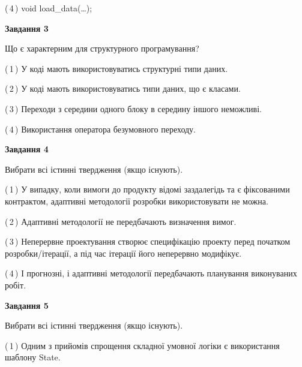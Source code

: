 \documentclass[10pt, ukrainian]{article}
\begin{document}
{\begin {large}
(\,4\,) void load\_data(…);%


{\begin {center}\textbf{Завдання 3}\end {center}}\par
Що є характерним для структурного програмування?\par
\vspace{2mm}



(\,1\,) У коді мають використовуватись структурні типи даних. %



(\,2\,) У коді мають використовуватись типи даних, що є класами. %



(\,3\,) Переходи з середини одного блоку в середину іншого неможливі. %



(\,4\,) Використання оператора безумовного переходу. %


{\begin {center}\textbf{Завдання 4}\end {center}}\par
Вибрати всі істинні твердження (якщо існують).\par
\vspace{2mm}



(\,1\,) У випадку, коли вимоги до продукту відомі заздалегідь та є фіксованими контрактом, адаптивні методології розробки використовувати не можна. %



(\,2\,) Адаптивні методології не передбачають визначення вимог. %



(\,3\,) Неперервне проектування створює специфікацію проекту перед початком розробки/ітерації, а під час ітерації його неперервно модифікує.%



(\,4\,) І прогнозні, і адаптивні методології передбачають планування виконуваних робіт. %


{\begin {center}\textbf{Завдання 5}\end {center}}\par
Вибрати всі істинні твердження (якщо існують).\par
\vspace{2mm}



(\,1\,) Одним з прийомів спрощення складної умовної логіки є використання шаблону State. %




\end{large}}
\end{document}
